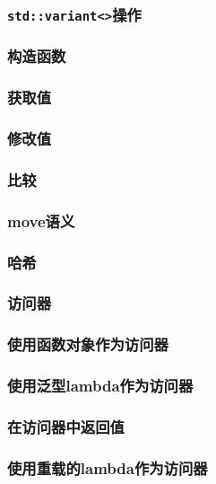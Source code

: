 \subsubsection{\texttt{std::variant<>}操作}
\subsubsection*{构造函数}
\subsubsection*{获取值}
\subsubsection*{修改值}
\subsubsection*{比较}
\subsubsection*{move语义}
\subsubsection*{哈希}

\subsubsection{访问器}
\subsubsection*{使用函数对象作为访问器}
\subsubsection*{使用泛型lambda作为访问器}\label{ch16.3.3.2}
\subsubsection*{在访问器中返回值}
\subsubsection*{使用重载的lambda作为访问器}\label{ch16.3.3.4}
